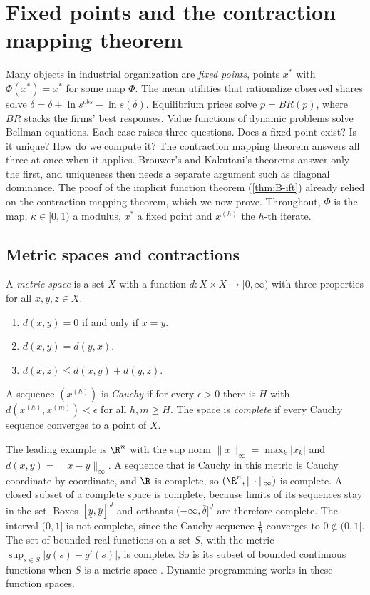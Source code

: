 \section{Fixed points and the contraction mapping theorem}\label{sec:B-fixedpoint}

Many objects in industrial organization are \emph{fixed points}, points $x^*$ with $\Phi(x^*) = x^*$ for some
map $\Phi$. The mean utilities that rationalize observed shares solve $\delta = \delta + \ln s^{obs} - \ln
s(\delta)$. Equilibrium prices solve $p = BR(p)$, where $BR$ stacks the firms' best responses. Value
functions of dynamic problems solve Bellman equations. Each case raises three questions. Does a fixed point
exist? Is it unique? How do we compute it? The contraction mapping theorem answers all three at once when it
applies. Brouwer's and Kakutani's theorems answer only the first, and uniqueness then needs a separate
argument such as diagonal dominance. The proof of the implicit function theorem (\cref{thm:B-ift}) already
relied on the contraction mapping theorem, which we now prove. Throughout, $\Phi$ is the map, $\kappa \in [0,1)$
a modulus, $x^*$ a fixed point and $x^{(h)}$ the $h$-th iterate.

\subsection{Metric spaces and contractions}\label{sec:B-metric}

\begin{definition}\label{def:B-metric}
A \emph{metric space} is a set $X$ with a function $d: X \times X \to [0, \infty)$ with three properties
for all $x, y, z \in X$.
\begin{enumerate}[label=(\roman*)]
  \item $d(x, y) = 0$ if and only if $x = y$.
  \item $d(x, y) = d(y, x)$.
  \item $d(x, z) \leq d(x, y) + d(y, z)$.
\end{enumerate}
A sequence $(x^{(h)})$ is \emph{Cauchy} if for every $\epsilon > 0$ there is $H$ with $d(x^{(h)},
x^{(m)}) < \epsilon$ for all $h, m \geq H$. The space is \emph{complete} if every Cauchy sequence converges
to a point of $X$.
\end{definition}

The leading example is $\R^n$ with the sup norm $\|x\|_\infty = \max_k |x_k|$ and $d(x, y) = \|x -
y\|_\infty$. A sequence that is Cauchy in this metric is Cauchy coordinate by coordinate, and $\R$ is
complete, so $(\R^n, \|\cdot\|_\infty)$ is complete. A closed subset of a complete space is complete, because
limits of its sequences stay in the set. Boxes $[\underline y, \bar y]^J$ and orthants $(-\infty, \bar
\delta]^J$ are therefore complete. The interval $(0, 1]$ is not complete, since the Cauchy sequence
$\frac{1}{h}$ converges to $0 \notin (0,1]$. The set of bounded real functions on a set $S$, with the metric
$\sup_{s \in S}|g(s) - g'(s)|$, is complete. So is its subset of bounded continuous functions when $S$ is a
metric space \citep{StokeyLucas1989}. Dynamic programming works in these function spaces.

